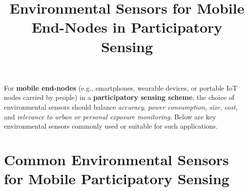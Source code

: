 \documentclass[12pt,a4paper]{article}
\title{Environmental Sensors for Mobile End-Nodes in Participatory Sensing}
\author{}
\date{}
\begin{document}
\maketitle

For \textbf{mobile end-nodes} (e.g., smartphones, wearable devices, or portable IoT nodes carried by people) in a \textbf{participatory sensing scheme}, the choice of environmental sensors should balance \textit{accuracy}, \textit{power consumption}, \textit{size}, \textit{cost}, and \textit{relevance to urban or personal exposure monitoring}. Below are key environmental sensors commonly used or suitable for such applications.

\section*{Common Environmental Sensors for Mobile Participatory Sensing}
\end{document}
